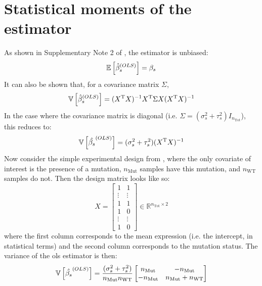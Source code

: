\section{Statistical moments of the  estimator}

As shown in Supplementary Note 2 of \cite[REF][]{pimentelDifferentialAnalysisRNAseq2017}, the estimator is unbiased:
%
\begin{equation}
  \mathbb{E} \left[  \hat{\beta}_s^{(OLS)}  \right] = \beta_s
\end{equation}
%
It can also be shown that, for a covariance matrix $\Sigma$,
%
\begin{equation}
  \mathbb{V} \left[  \hat{\beta}_s^{(OLS)}  \right] = (X^{\mathrm{T}} X)^{-1} X^{\mathrm{T}} \Sigma X (X^{\mathrm{T}} X)^{-1}
\end{equation}
%
In the case where the covariance matrix is diagonal (i.e. $\Sigma = (\sigma_s^2 + \tau_s^2)I_{n_\mathrm{Tot}}$), this reduces to:
%
\begin{equation}
  \mathbb{V} \left[  \hat{\beta_s}^{(OLS)}  \right] = (\sigma_s^2 + \tau_s^2)(X^{\mathrm{T}} X)^{-1}
\end{equation}
%
Now consider the simple experimental design from , where the only covariate of interest is the presence of a mutation, $n_\mathrm{Mut}$ samples have this mutation, and $n_\mathrm{WT}$ samples do not.
Then the design matrix looks like so:
%
\begin{equation}
  X = \begin{bmatrix}
    1      & 1      \\
    \vdots & \vdots \\
    1      & 1      \\
    1      & 0      \\
    \vdots & \vdots \\
    1      & 0
  \end{bmatrix}
  \in \mathbb{R}^{n_\mathrm{Tot} \times 2}
\end{equation}
%
where the first column corresponds to the mean expression (i.e. the intercept, in statistical terms) and the second column corresponds to the mutation status.
The variance of the \gls{ols} estimator is then:
%
\begin{equation}
  \mathbb{V} \left[  \hat{\beta_s}^{(OLS)}  \right] = \frac{(\sigma_s^2 + \tau_s^2)}{n_\mathrm{Mut} n_\mathrm{WT}}
  \begin{bmatrix}
    n_\mathrm{Mut}   & -n_\mathrm{Mut}                \\
    - n_\mathrm{Mut} & n_\mathrm{Mut} + n_\mathrm{WT} \\
  \end{bmatrix}
\end{equation}
